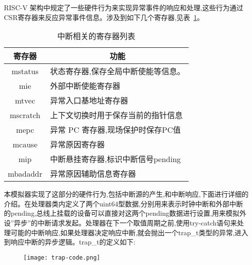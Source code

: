 RISC-V 架构中规定了一些硬件行为来实现异常事件的响应和处理,这些行为通过CSR寄存器来反应异常事件信息。涉及到如下几个寄存器,见表~\ref{tab:csr}。
\begin{table}[H]
  \centering
  \caption{中断相关的寄存器列表}
  \label{tab:csr}
  \renewcommand\arraystretch{1.2}
  \begin{tabular}{cl}
    \toprule
寄存器	& \multicolumn{1}{c}{功能}\\
    \midrule
    mstatus	& \multicolumn{1}{m{7cm}}{状态寄存器,保存全局中断使能等信息。}\\ \hline
    mie	& \multicolumn{1}{m{7cm}}{外部中断使能寄存器}\\ \hline
    mtvec	& \multicolumn{1}{m{7cm}}{异常入口基地址寄存器}\\ \hline
    mscratch & \multicolumn{1}{m{7cm}}{上下文切换时用于保存当前的指针信息}\\ \hline
    mepc & \multicolumn{1}{m{7cm}}{异常 PC 寄存器,现场保护时保存PC值}\\ \hline
    mcause & \multicolumn{1}{m{7cm}}{异常原因寄存器}\\ \hline
    mip	& \multicolumn{1}{m{7cm}}{中断悬挂寄存器,标识中断信号pending}\\ \hline
    mbadaddr & \multicolumn{1}{m{7cm}}{异常原因辅助信息寄存器}\\
    \bottomrule
  \end{tabular}
\end{table}

本模拟器实现了这部分的硬件行为,包括中断源的产生,和中断响应,下面进行详细的介绍。在处理器类内定义了两个uint64型数据,分别用来表示时钟中断和外部中断的pending,总线上挂载的设备可以直接对这两个pending数据进行设置,用来模拟外设”异步”的中断请求发起。处理器在下一个取值周期之前,使用try-catch语句来处理可能的中断响应,如果处理器决定响应中断,就会抛出一个trap\_t类型的异常,进入到响应中断的异步逻辑。trap\_t的定义如下:
\begin{figure}[H]
    \centering
    \texttt{[image: trap-code.png]}
    \label{fig:trap-code}
\end{figure}
\vspace{-0.8cm} 

